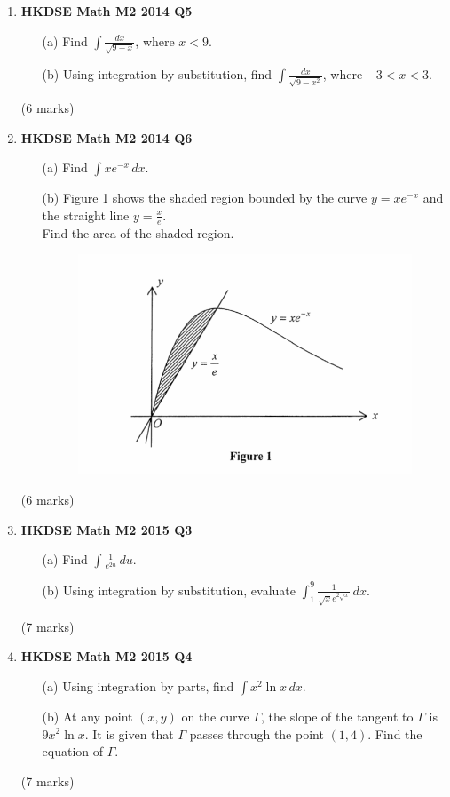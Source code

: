 \documentclass{report}
\begin{document}
\begin{enumerate}
	\item \textbf{HKDSE Math M2 2014 Q5}
	\begin{enumerate}
		\item [(a)]Find $\displaystyle\int \frac{dx}{\sqrt{9-x}}$, where $x < 9$. 
		\item [(b)]Using integration by substitution, find $\displaystyle\int \frac{dx}{\sqrt{9-x^2}}$, where $-3 < x < 3$.
	\end{enumerate}
	(6 marks)

	\item \textbf{HKDSE Math M2 2014 Q6}
	\begin{enumerate}
		\item [(a)]Find $\displaystyle\int xe^{-x}\,dx$. 
		\item [(b)]Figure 1 shows the shaded region bounded by the curve $y = xe^{-x}$ and the straight line $y = \displaystyle\frac{x}{e}$. \\
		Find the area of the shaded region.
		\begin{figure}[H]
			\centering
			\includegraphics[width = .5\linewidth]{2014Figure1}
		\end{figure}
	\end{enumerate}
	(6 marks)

	\newpage

	\item \textbf{HKDSE Math M2 2015 Q3}
	\begin{enumerate}
		\item [(a)]Find $\displaystyle\int \frac{1}{e^{2u}} \,du$. 
		\item [(b)]Using integration by substitution, evaluate $\displaystyle\int_1^9 \frac{1}{\sqrt{x}e^{2\sqrt{x}}}\,dx$. 
	\end{enumerate}
	(7 marks)

	\item \textbf{HKDSE Math M2 2015 Q4}
	\begin{enumerate}
		\item [(a)]Using integration by parts, find $\displaystyle\int x^2 \ln{x} \,dx $. 
		\item [(b)]At any point $(x,y)$ on the curve $\Gamma $, the slope of the tangent to $\Gamma$ is $9x^2 \ln{x}$. It is given that $\Gamma$ passes through the point $(1,4)$. Find the equation of $\Gamma$.  
	\end{enumerate}
	(7 marks)	


\end{enumerate}
\end{document}
